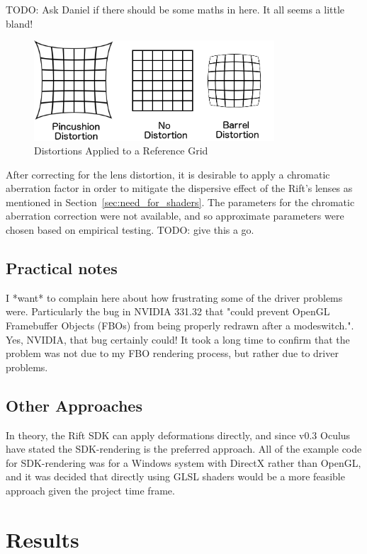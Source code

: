 \documentclass[MSc,paper=a4,pagesize=auto]{icldt}
\begin{document}
TODO: Ask Daniel if there should be some maths in here. It all seems a little bland!

\begin{figure}[htbp!]
    \centering
    \includegraphics[width=0.8\textwidth]{resources/distortions}
    \caption{Distortions Applied to a Reference Grid}
    \label{fig:distortions}
\end{figure}

After correcting for the lens distortion, it is desirable to apply a chromatic aberration factor in order to mitigate the dispersive effect of the Rift's lenses as mentioned in Section~\ref{sec:need_for_shaders}. The parameters for the chromatic aberration correction were not available, and so approximate parameters were chosen based on empirical testing. TODO: give this a go. 

\section{Practical notes}
I *want* to complain here about how frustrating some of the driver problems were. Particularly the bug in NVIDIA 331.32 that "could prevent OpenGL Framebuffer Objects (FBOs) from being properly redrawn after a modeswitch.". Yes, NVIDIA, that bug certainly could! It took a long time to confirm that the problem was not due to my FBO rendering process, but rather due to driver problems.


\section{Other Approaches}
In theory, the Rift SDK can apply deformations directly, and since v0.3 Oculus have stated the SDK-rendering is the preferred approach. All of the example code for SDK-rendering was for a Windows system with DirectX rather than OpenGL, and it was decided that directly using GLSL shaders would be a more feasible approach given the project time frame. 

\chapter{Results}
\end{document}
